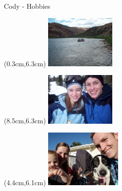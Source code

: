 \documentclass{beamer}
\begin{document}
\begin{frame}{Cody - Hobbies}
   \begin{textblock*}{\textwidth}(0.3cm,6.3cm) %
      \includegraphics[width=3.5cm]{figures/rafting.jpg}
   \end{textblock*}
   \begin{textblock*}{\textwidth}(8.5cm,6.3cm) %
      \includegraphics[width=3.5cm]{figures/skiing.jpg}
   \end{textblock*}
   \begin{textblock*}{\textwidth}(4.4cm,6.1cm) %
      \includegraphics[width=3.8cm]{figures/ziggy.jpg}
   \end{textblock*}
\end{frame}
\end{document}
